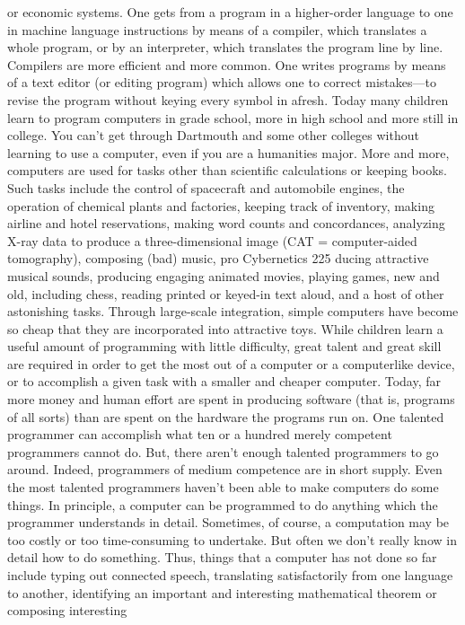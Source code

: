 {{{{{{{{{{{or economic systems.
One gets from a program in a higher-order language to one in
machine language instructions by means of a compiler, which translates
a whole program, or by an interpreter, which translates the
program line by line. Compilers are more efficient and more common.
One writes programs by means of a text editor (or editing
program) which allows one to correct mistakes—to revise the program
without keying every symbol in afresh.
Today many children learn to program computers in grade
school, more in high school and more still in college. You can’t
get through Dartmouth and some other colleges without learning
to use a computer, even if you are a humanities major.
More and more, computers are used for tasks other than scientific
calculations or keeping books. Such tasks include the control
of spacecraft and automobile engines, the operation of chemical
plants and factories, keeping track of inventory, making airline
and hotel reservations, making word counts and concordances,
analyzing X-ray data to produce a three-dimensional image (CAT
= computer-aided tomography), composing (bad) music, pro
Cybernetics 225
ducing attractive musical sounds, producing engaging animated
movies, playing games, new and old, including chess, reading
printed or keyed-in text aloud, and a host of other astonishing
tasks. Through large-scale integration, simple computers have
become so cheap that they are incorporated into attractive toys.
While children learn a useful amount of programming with little
difficulty, great talent and great skill are required in order to get
the most out of a computer or a computerlike device, or to accomplish
a given task with a smaller and cheaper computer.
Today, far more money and human effort are spent in producing
software (that is, programs of all sorts) than are spent on the
hardware the programs run on. One talented programmer can
accomplish what ten or a hundred merely competent programmers
cannot do. But, there aren’t enough talented programmers to go
around. Indeed, programmers of medium competence are in short
supply.
Even the most talented programmers haven’t been able to make
computers do some things. In principle, a computer can be programmed
to do anything which the programmer understands in
detail. Sometimes, of course, a computation may be too costly or
too time-consuming to undertake. But often we don’t really know
in detail how to do something. Thus, things that a computer has not
done so far include typing out connected speech, translating satisfactorily
from one language to another, identifying an important
and interesting mathematical theorem or composing interesting
}}}}}}}}}}}
